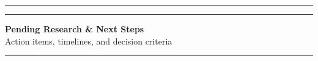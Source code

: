 \documentclass[10pt, a4paper]{article}
\begin{document}
\vspace{0.2em}

\begin{center}
    \noindent\rule{\linewidth}{1.5pt}
\end{center}

\newpage

\begin{center}
    \noindent\rule{\linewidth}{1.5pt}
    
    \vspace{0.05em}
    
    {\large \textbf{Pending Research \& Next Steps}} \\[0.05em]
    {\footnotesize Action items, timelines, and decision criteria}
    
    \vspace{0.05em}
    
    \noindent\rule{\linewidth}{1.5pt}
\end{center}

\vspace{0.3em}
\end{document}

